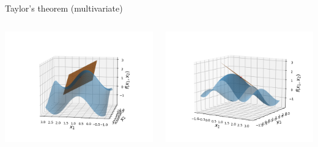 \documentclass[11pt,compress,t,notes=noshow, xcolor=table]{beamer}
\begin{document}
\begin{vbframe}{Taylor's theorem (multivariate)}
\begin{columns}
    \begin{column}{0.4\textwidth}
        \includegraphics[width = \textwidth]{figure_man/Taylor2D/Taylor2D_1st100.png}
    \end{column}
    \begin{column}{0.4\textwidth}
        \includegraphics[width = \textwidth]{figure_man/Taylor2D/Taylor2D_1st301.png}
    \end{column}
\end{columns}

\framebreak


\end{vbframe}
\end{document}
